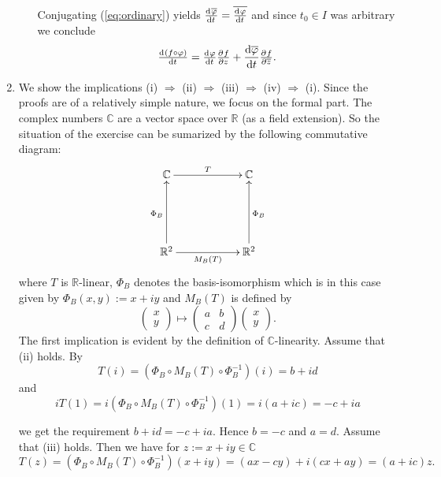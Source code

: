 \begin{enumerate}[label = \textbf{Exercise \arabic*.},wide = 0pt, itemsep=1.5ex]
\begin{enumerate}[label = (\roman*),wide = 0pt, itemsep=1.5ex]
				Conjugating (\ref{eq:ordinary}) yields $\od{\overline{\varphi}}{t} = \overline{\od{\varphi}{t}}$ and since $t_0 \in I$ was arbitrary we conclude
				\begin{equation}
					\od{(f \circ \varphi)}{t} = \od{\varphi}{t}\pd{f}{z} + \frac{\d \overline{\varphi}}{\d t}\pd{f}{\overline{z}}.
				\end{equation}
				\end{enumerate}

	\item We show the implications (i) $\Rightarrow$ (ii) $\Rightarrow$ (iii) $\Rightarrow$ (iv) $\Rightarrow$ (i). Since the proofs are of a relatively simple nature, we focus on the formal part. The complex numbers $\mathbb{C}$ are a vector space over $\mathbb{R}$ (as a field extension). So the situation of the exercise can be sumarized by the following commutative diagram:
		\[
			\xymatrix@=2cm{
				\mathbb{C} \ar[r]^T &\mathbb{C}\\
				\mathbb{R}^2 \ar[u]^{\Phi_B} \ar[r]_{M_B(T)} &\mathbb{R}^2 \ar[u]_{\Phi_B}}
	 	\]
		\noindent where $T$ is $\mathbb{R}$-linear, $\Phi_B$ denotes the basis-isomorphism which is in this case given by $\Phi_B(x,y) := x + iy$ and $M_B(T)$ is defined by
		\begin{equation}
			\begin{pmatrix}
				x\\
				y
			\end{pmatrix} \mapsto
			\begin{pmatrix}
				a & b\\
				c & d
			\end{pmatrix}
			\begin{pmatrix}
				x\\
				y
			\end{pmatrix}.
		\end{equation}
		The first implication is evident by the definition of $\mathbb{C}$-linearity. Assume that (ii) holds. By 
		\begin{equation}
			T(i) = (\Phi_B \circ M_B(T) \circ \Phi_B^{-1})(i) = b + id
		\end{equation}
		\noindent and
		\begin{equation}
			iT(1) = i(\Phi_B \circ M_B(T) \circ \Phi_B^{-1})(1) = i(a + ic) = -c + ia 
		\end{equation}

		\noindent we get the requirement $b + id = -c + ia$. Hence $b = -c$ and $a = d$. Assume that (iii) holds. Then we have for $z := x + iy \in \mathbb{C}$
		\begin{equation}
			T(z) = (\Phi_B \circ M_B(T) \circ \Phi_B^{-1})(x + iy) = (ax - cy) + i(cx + ay) = (a + ic)z.
		\end{equation}


\end{enumerate}
